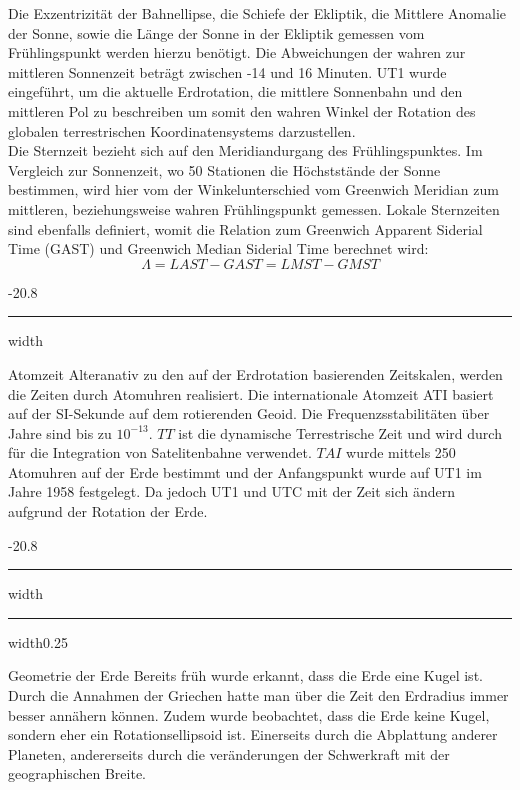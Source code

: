 \documentclass[9pt, landscape, fleqn]{scrartcl}
\makeatletter
\renewcommand{\section}{\@startsection{section}{1}{0mm}%
{-2\baselineskip}{0.8\baselineskip}%
{\hrule depth 0.2pt width\columnwidth\hrule depth1.5pt
width0.25\columnwidth\vspace*{1.2em}\Large\bfseries\rmfamily}}
\renewcommand{\subsubsection}{\@startsection{subsubsection}{1}{0mm}%
{-2\baselineskip}{0.8\baselineskip}%
{\hrule depth 0.2pt width\columnwidth\vspace*{1.2em}\normalsize\bfseries\rmfamily}}
\makeatother
\begin{document}
\begin{multicols*}{3}
Die Exzentrizität der Bahnellipse, die Schiefe der Ekliptik, die Mittlere Anomalie der Sonne, sowie die Länge der Sonne in der Ekliptik gemessen vom Frühlingspunkt werden hierzu benötigt. Die Abweichungen der wahren zur mittleren Sonnenzeit beträgt zwischen -14 und 16 Minuten. UT1 wurde eingeführt, um die aktuelle Erdrotation, die mittlere Sonnenbahn und den mittleren Pol zu beschreiben um somit den wahren Winkel der Rotation des globalen terrestrischen Koordinatensystems darzustellen. \\

Die Sternzeit bezieht sich auf den Meridiandurgang des Frühlingspunktes. Im Vergleich zur Sonnenzeit, wo 50 Stationen die Höchststände der Sonne bestimmen, wird hier vom der Winkelunterschied vom Greenwich Meridian zum mittleren, beziehungsweise wahren Frühlingspunkt gemessen. Lokale Sternzeiten sind ebenfalls definiert, womit die Relation zum Greenwich Apparent Siderial Time (GAST) und Greenwich Median Siderial Time berechnet wird:
\begin{equation*}
    \Lambda = LAST-GAST = LMST - GMST
\end{equation*}
 
\subsubsection{Atomzeit}
Alteranativ zu den auf der Erdrotation basierenden Zeitskalen, werden die Zeiten durch Atomuhren realisiert. Die internationale Atomzeit ATI basiert auf der SI-Sekunde auf dem rotierenden Geoid. Die Frequenzsstabilitäten über Jahre sind bis zu $10^{-13}$. $TT$ ist die dynamische Terrestrische Zeit und wird durch für die Integration von Satelitenbahne verwendet. $TAI$ wurde mittels 250 Atomuhren auf der Erde bestimmt und der Anfangspunkt wurde auf UT1 im Jahre 1958 festgelegt. Da jedoch UT1 und UTC mit der Zeit sich ändern aufgrund der Rotation der Erde.

\section{Geometrie der Erde}
Bereits früh wurde erkannt, dass die Erde eine Kugel ist. Durch die Annahmen der Griechen hatte man über die Zeit den Erdradius immer besser annähern können. Zudem wurde beobachtet, dass die Erde keine Kugel, sondern eher ein Rotationsellipsoid ist. Einerseits durch die Abplattung anderer Planeten,
andererseits durch die veränderungen der Schwerkraft mit der geographischen Breite. 


\end{multicols*}
\end{document}

